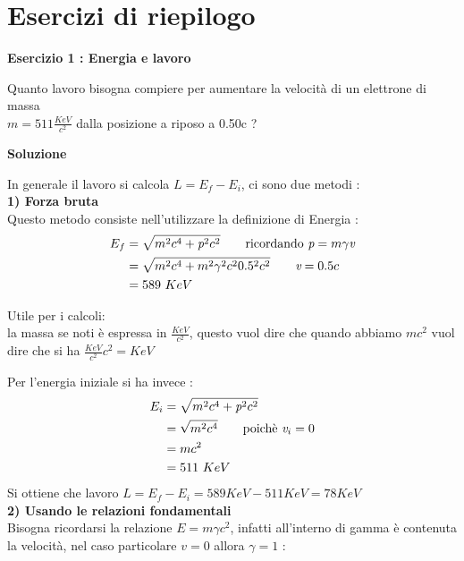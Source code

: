 \documentclass[a4paper, 12pt, twoside]{report}
\begin{document}
\section{Esercizi di riepilogo}
\begin{center}{\textbf{Esercizio 1 : Energia e lavoro}}\end{center}
Quanto lavoro bisogna compiere per aumentare la velocità di un elettrone di massa \\ 
$m = 511 \frac{KeV}{c^2}$ dalla posizione a riposo a 0.50c ? 
\begin{center}{\textbf{Soluzione}}\end{center}
In generale il lavoro si calcola $ L = E_{f} - E_{i}$, ci sono due metodi :\\ 
\textbf{1) Forza bruta} \\
Questo metodo consiste nell'utilizzare la definizione di Energia : \\ 
\begin{align*}
        E_{f} &= \sqrt{m^2c^4 + \textit{p}^2c^2} \tag*{ricordando $\textit{p} = m\gamma\textit{v}$}\\ 
          &= \sqrt{m^2c^4 +m^2\gamma^2c^20.5^2c^2} \tag*{$\textit{v} = 0.5c$}\\
          &= 589 \ KeV
\end{align*}
\begin{tcolorbox}[colback=red!5!white,colframe=red!50!black,title=ATTENZIONE !]
Utile per i calcoli: \\
la massa se noti è espressa in $\frac{KeV}{c^2}$, questo vuol dire che quando abbiamo $mc^2$ 
vuol dire che si ha $\frac{KeV}{c^2}c^2 = KeV$
\end{tcolorbox}
Per l'energia iniziale si ha invece : \\
\begin{align*}
    E_{i} &= \sqrt{m^2c^4 + \textit{p}^2c^2} \\
          &= \sqrt{m^2c^4} \tag*{poichè $\textit{v}_{i} = 0$}\\
          &= mc^2 \\
          &= 511 \ KeV
\end{align*}
Si ottiene che lavoro $L = E_{f} - E_{i} = 589 KeV - 511 KeV = 78 KeV$ \\
\textbf{2) Usando le relazioni fondamentali}\\
Bisogna ricordarsi la relazione $E = m\gamma c^2$, infatti all'interno di gamma è contenuta la 
velocità, nel caso particolare $\textit{v} = 0$ allora $\gamma = 1$ : \\
\end{document}
